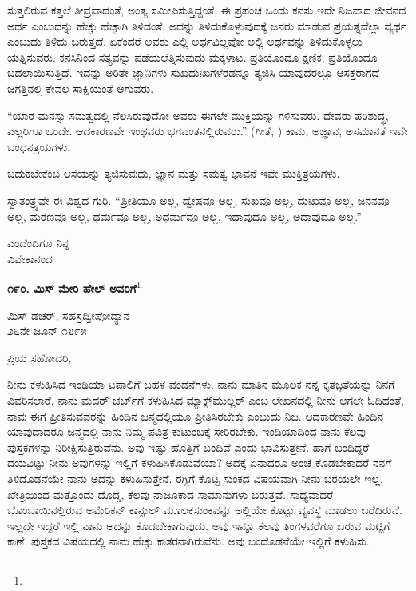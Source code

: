ಸುತ್ತಲಿರುವ ಕತ್ತಲೆ ತೀವ್ರವಾದಂತೆ, ಅಂತ್ಯ ಸಮೀಪಿಸುತ್ತಿದ್ದಂತೆ, ಈ ಪ್ರಪಂಚ ಒಂದು ಕನಸು\enginline{-} ಇದೇ ನಿಜವಾದ ಜೀವನದ ಅರ್ಥ ಎಂಬುದನ್ನು ಹೆಚ್ಚು ಹೆಚ್ಚಾಗಿ ತಿಳಿದಂತೆ, ಅದನ್ನು ತಿಳಿದುಕೊಳ್ಳುವುದಕ್ಕೆ ಜನರು ಮಾಡುವ ಪ್ರಯತ್ನವೆಲ್ಲಾ ವ್ಯರ್ಥ ಎಂಬುದು ತಿಳಿದು ಬರುತ್ತದೆ. ಏಕೆಂದರೆ ಅವರು ಎಲ್ಲಿ ಅರ್ಥವಿಲ್ಲವೋ ಅಲ್ಲಿ ಅರ್ಥವನ್ನು ತಿಳಿದುಕೊಳ್ಳಲು ಯತ್ನಿಸುವರು. ಕನಸಿನಿಂದ ಸತ್ಯವನ್ನು ಪಡೆಯಲೆತ್ನಿಸುವುದು ಮಕ್ಕಳಾಟ. ಪ್ರತಿಯೊಂದೂ ಕ್ಷಣಿಕ, ಪ್ರತಿಯೊಂದೂ ಬದಲಾಯಿಸುತ್ತಿದೆ. ಇದನ್ನು ಅರಿತೇ ಜ್ಞಾನಿಗಳು ಸುಖ\break ದುಃಖಗಳೆರಡನ್ನೂ ತ್ಯಜಿಸಿ ಯಾವುದರಲ್ಲೂ ಆಸಕ್ತರಾಗದೆ ಜಗತ್ತಿನಲ್ಲಿ ಕೇವಲ ಸಾಕ್ಷಿಯಂತೆ ಆಗುವರು.

“ಯಾರ ಮನಸ್ಸು ಸಮತ್ವದಲ್ಲಿ ನೆಲಸಿರುವುದೋ ಅವರು ಈಗಲೇ ಮುಕ್ತಿಯನ್ನು ಗಳಿಸುವರು. ದೇವರು ಪರಿಶುದ್ಧ, ಎಲ್ಲರಿಗೂ ಒಂದೇ. ಆದಕಾರಣವೇ ಇಂಥವರು ಭಗವಂತನಲ್ಲಿರುವರು.” (ಗೀತೆ, ) ಕಾಮ, ಅಜ್ಞಾನ, ಅಸಮಾನತೆ ಇವೇ ಬಂಧನತ್ರ\break ಯಗಳು.

ಬದುಕಬೇಕೆಂಬ ಆಸೆಯನ್ನು ತ್ಯಜಿಸುವುದು, ಜ್ಞಾನ ಮತ್ತು ಸಮತ್ವ ಭಾವನೆ ಇವೇ ಮುಕ್ತಿತ್ರಯಗಳು.

ಸ್ವಾತಂತ್ರ್ಯವೇ ಈ ವಿಶ್ವದ ಗುರಿ. ``ಪ್ರೀತಿಯೂ ಅಲ್ಲ, ದ್ವೇಷವೂ ಅಲ್ಲ, ಸುಖವೂ ಅಲ್ಲ, ದುಃಖವೂ ಅಲ್ಲ, ಜನನವೂ ಅಲ್ಲ, ಮರಣವೂ ಅಲ್ಲ, ಧರ್ಮವೂ ಅಲ್ಲ, ಅಧರ್ಮವೂ ಅಲ್ಲ, ಇದಾವುದೂ ಅಲ್ಲ, ಅದಾವುದೂ ಅಲ್ಲ.''

\vspace{-0.5cm}

{\flushright
ಎಂದೆಂದಿಗೂ ನಿನ್ನ\\ವಿವೇಕಾನಂದ\par}

\begin{center}
\textbf{೧೯೦. ಮಿಸ್ ಮೇರಿ ಹೇಲ್‌ ಅವರಿಗೆ}\footnote{}
\end{center}

\vspace{-0.5cm}

\begin{flushright}
 ಮಿಸ್ ಡಚರ್‌, ಸಹಸ್ರದ್ವೀಪೋದ್ಯಾನ\\೨೬ನೇ ಜೂನ್ ೧೮೯೫
\end{flushright}

ಪ್ರಿಯ ಸಹೋದರಿ,

ನೀನು ಕಳುಹಿಸಿದ ಇಂಡಿಯಾ ಟಪಾಲಿಗೆ ಬಹಳ ವಂದನೆಗಳು. ನಾನು ಮಾತಿನ ಮೂಲಕ ನನ್ನ ಕೃತಜ್ಞತೆಯನ್ನು ನಿನಗೆ ವಿವರಿಸಲಾರೆ. ನಾನು ಮದರ್‌ ಚರ್ಚ್‌ಗೆ ಕಳುಹಿಸಿದ ಮ್ಯಾಕ್ಸ್‌ಮುಲ್ಲರ್‌  ಎಂಬ ಲೇಖನದಲ್ಲಿ ನೀನು ಆಗಲೇ ಓದಿದಂತೆ, ನಾವು ಈಗ ಪ್ರೀತಿಸುವವರನ್ನು ಹಿಂದಿನ ಜನ್ಮದಲ್ಲಿಯೂ ಪ್ರೀತಿಸಿರಬೇಕು ಎಂಬುದು ನಿಜ. ಆದಕಾರಣವೇ ಹಿಂದಿನ ಯಾವುದಾದರೂ ಜನ್ಮದಲ್ಲಿ ನಾನು ನಿಮ್ಮ ಪವಿತ್ರ ಕುಟುಂಬಕ್ಕೆ ಸೇರಿರಬೇಕು. ಇಂಡಿಯಾದಿಂದ ನಾನು ಕೆಲವು ಪುಸ್ತಕಗಳನ್ನು ನಿರೀಕ್ಷಿಸುತ್ತಿರುವೆನು. ಅವು ಇಷ್ಟು ಹೊತ್ತಿಗೆ ಬಂದಿವೆ ಎಂದು ಭಾವಿಸುತ್ತೇನೆ. ಹಾಗೆ ಬಂದಿದ್ದರೆ ದಯವಿಟ್ಟು ನೀನು ಅವುಗಳನ್ನು ಇಲ್ಲಿಗೆ ಕಳುಹಿಸಿಕೊಡುವೆಯಾ? ಅದಕ್ಕೆ ಏನಾದರೂ ಅಂಚೆ ಕೊಡಬೇಕಾದರೆ ನನಗೆ ತಿಳಿದೊಡನೆಯೇ ನಾನು ಅದನ್ನು ಕಳುಹಿಸುತ್ತೇನೆ. ರಗ್ಗಿಗೆ ಕೊಟ್ಟ ಸುಂಕದ ವಿಷಯವಾಗಿ ನೀನು ಬರಯಲೇ ಇಲ್ಲ. ಖೇತ್ರಿಯಿಂದ ಮತ್ತೊಂದು ದೊಡ್ಡ, ಕೆಲವು ನಾಜೂಕಾದ ಸಾಮಾನುಗಳು ಬರುತ್ತವೆ. ಸಾಧ್ಯವಾದರೆ ಬೊಂಬಾಯಿನಲ್ಲಿರುವ ಅಮೆರಿಕನ್ ಕಾನ್ಸುಲ್ ಮೂಲಕ\break ಸುಂಕವನ್ನು ಅಲ್ಲಿಯೇ ಕೊಟ್ಟು ವ್ಯವಸ್ಥೆ ಮಾಡಲು ಬರೆದಿರುವೆ. ಇಲ್ಲದೇ ಇದ್ದರೆ ಇಲ್ಲಿ ನಾನು ಅದನ್ನು ಕೊಡಬೇಕಾಗುವುದು. ಅವು ಇನ್ನೂ ಕೆಲವು ತಿಂಗಳವರೆಗೂ ಬರುವ ಮಟ್ಟಿಗೆ ಕಾಣೆ. ಪುಸ್ತಕದ ವಿಷಯದಲ್ಲಿ ನಾನು ಹೆಚ್ಚು ಕಾತರನಾಗಿರುವೆನು. ಅವು ಬಂದೊಡನೆಯೇ ಇಲ್ಲಿಗೆ ಕಳುಹಿಸು.

